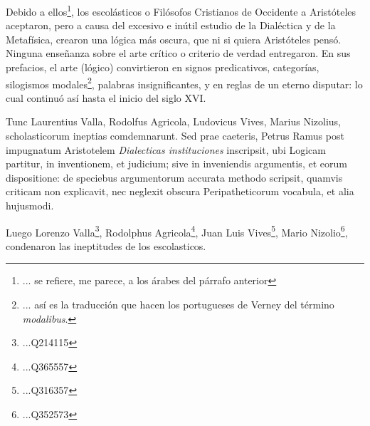 \documentclass{article}
\begin{document}
\begin{paracol}{2}
\begin{nthcolumn*}{0}
\end{nthcolumn*}
\vspace{0.5cm}
\begin{nthcolumn}{1} %
  Debido a ellos\footnote{... se refiere, me parece, a los árabes del párrafo anterior}, los escolásticos o Filósofos Cristianos de Occidente a Aristóteles aceptaron, pero a causa del excesivo e inútil estudio de la Dialéctica y de la Metafísica, crearon una lógica más oscura, que ni si quiera Aristóteles pensó. Ninguna enseñanza sobre el arte crítico o criterio de verdad entregaron. En sus prefacios, el arte (lógico) convirtieron en signos predicativos, categorías, silogismos modales\footnote{... así es la traducción que hacen los portugueses de Verney del término \emph{modalibus}.}, palabras insignificantes, y en reglas de un eterno disputar: lo cual continuó así hasta el inicio del siglo XVI.
\end{nthcolumn}
\vspace{0.5cm}
\begin{nthcolumn*}{0} %
  Tunc Laurentius Valla, Rodolfus Agricola, Ludovicus Vives, Marius Nizolius, scholasticorum ineptias comdemnarunt. Sed prae caeteris, Petrus Ramus post impugnatum Aristotelem \emph{Dialecticas instituciones} inscripsit, ubi Logicam partitur, in inventionem, et judicium; sive in inveniendis argumentis, et eorum dispositione: de speciebus argumentorum accurata methodo scripsit, quamvis criticam non explicavit, nec neglexit obscura Peripatheticorum vocabula, et alia hujusmodi.
\end{nthcolumn*}
\vspace{0.5cm}
\begin{nthcolumn}{1} %
  Luego Lorenzo Valla\footnote{...Q214115}, Rodolphus Agricola\footnote{...Q365557}, Juan Luis Vives\footnote{...Q316357}, Mario Nizolio\footnote{...Q352573}, condenaron las ineptitudes de los escolasticos. 
\end{nthcolumn}
\vspace{0.5cm}
\end{paracol}
\end{document}
